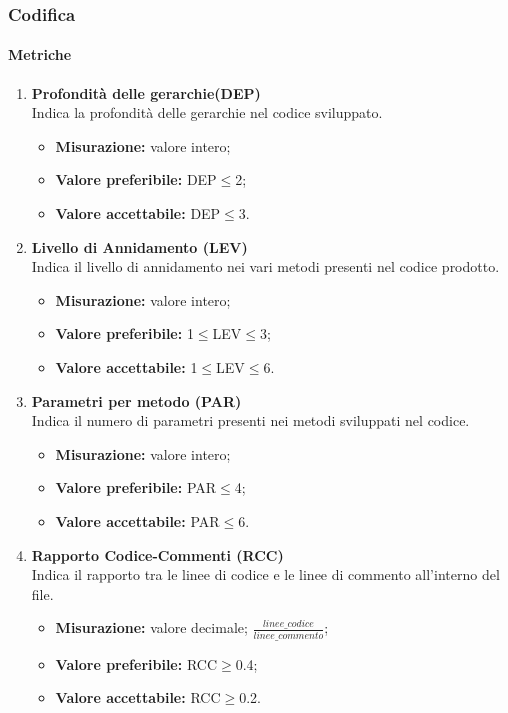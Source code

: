 	\subsubsection{Codifica}
		\paragraph{Metriche} 
		\begin{enumerate}
		\item[]
		
			\textbf{Profondità delle gerarchie(DEP)}\\
			Indica la profondità delle gerarchie nel codice sviluppato.
			\begin{itemize}
				\item \textbf{Misurazione:} valore intero;
				\item \textbf{Valore preferibile:} DEP$\leq$2;
				\item \textbf{Valore accettabile:} DEP$\leq$3.
			\end{itemize}
\pagebreak
		\item[]
			\textbf{Livello di Annidamento (LEV)}\\
			Indica il livello di annidamento nei vari metodi presenti nel codice prodotto.
			\begin{itemize}
				\item \textbf{Misurazione:} valore intero;
				\item \textbf{Valore preferibile:} 1$\leq$LEV$\leq$3;
				\item \textbf{Valore accettabile:} 1$\leq$LEV$\leq$6.
			\end{itemize}
		\item[]
			\textbf{Parametri per metodo (PAR)}\\
			Indica il numero di parametri presenti nei metodi sviluppati nel codice.
			\begin{itemize}
				\item \textbf{Misurazione:} valore intero;
				\item \textbf{Valore preferibile:} PAR$\leq$4;
				\item \textbf{Valore accettabile:} PAR$\leq$6.
			\end{itemize}
		\item[]
			\textbf{Rapporto Codice-Commenti (RCC)}\\
			Indica il rapporto tra le linee di codice e le linee di commento all'interno del file.
			\begin{itemize}
				\item \textbf{Misurazione:} valore decimale; $\frac{linee\_codice}{linee\_commento}$;
				\item \textbf{Valore preferibile:} RCC$\geq$0.4;
				\item \textbf{Valore accettabile:} RCC$\geq$0.2.
			\end{itemize}
		\end{enumerate}

